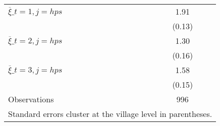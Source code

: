 \begin{table}[htbp]
{\begin{tabular}{l*{1}{c}}
$\overline{\xi}\_{t=1,j=hps}$&     1.91\sym{***}\\
                &   (0.13)         \\
$\overline{\xi}\_{t=2,j=hps}$&     1.30\sym{***}\\
                &   (0.16)         \\
$\overline{\xi}\_{t=3,j=hps}$&     1.58\sym{***}\\
                &   (0.15)         \\
\midrule
Observations    &      996         \\
\bottomrule
\multicolumn{2}{l}{\footnotesize Standard errors cluster at the village level in parentheses.}\\
\end{tabular}}
\end{table}
